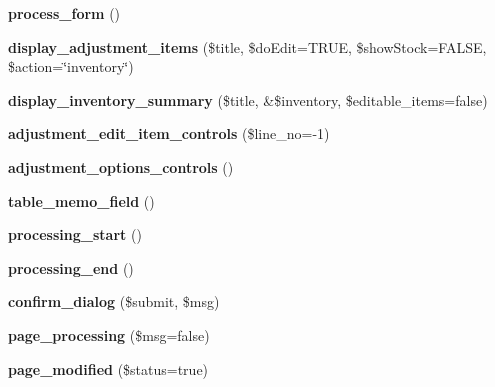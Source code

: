 \begin{DoxyCompactItemize}
\item 
\hypertarget{class_inventory__ui_a36f2f5f79b5aff91d0b736e92f13ff6a}{}\label{class_inventory__ui_a36f2f5f79b5aff91d0b736e92f13ff6a} 
{\bfseries process\+\_\+form} ()
\item 
\hypertarget{class_inventory__ui_a20ada151ac5c6c59298f56e00b3ebdb5}{}\label{class_inventory__ui_a20ada151ac5c6c59298f56e00b3ebdb5} 
{\bfseries display\+\_\+adjustment\+\_\+items} (\$title, \$do\+Edit=T\+R\+UE, \$show\+Stock=F\+A\+L\+SE, \$action=\char`\"{}inventory\char`\"{})
\item 
\hypertarget{class_inventory__ui_a2c9cd2fb8448bb17cbebd6394ab19522}{}\label{class_inventory__ui_a2c9cd2fb8448bb17cbebd6394ab19522} 
{\bfseries display\+\_\+inventory\+\_\+summary} (\$title, \&\$inventory, \$editable\+\_\+items=false)
\item 
\hypertarget{class_inventory__ui_a5692fdde9f762dad33c69b721365481b}{}\label{class_inventory__ui_a5692fdde9f762dad33c69b721365481b} 
{\bfseries adjustment\+\_\+edit\+\_\+item\+\_\+controls} (\$line\+\_\+no=-\/1)
\item 
\hypertarget{class_inventory__ui_a5066d159626933340a36ecf6ccbcd105}{}\label{class_inventory__ui_a5066d159626933340a36ecf6ccbcd105} 
{\bfseries adjustment\+\_\+options\+\_\+controls} ()
\item 
\hypertarget{class_inventory__ui_a494952c93f34161134321691d81cb690}{}\label{class_inventory__ui_a494952c93f34161134321691d81cb690} 
{\bfseries table\+\_\+memo\+\_\+field} ()
\item 
\hypertarget{class_inventory__ui_a0d542d348553d2eae53d09c6b50fcdc5}{}\label{class_inventory__ui_a0d542d348553d2eae53d09c6b50fcdc5} 
{\bfseries processing\+\_\+start} ()
\item 
\hypertarget{class_inventory__ui_a0b19598c5da12d8b6575839fe43ed57c}{}\label{class_inventory__ui_a0b19598c5da12d8b6575839fe43ed57c} 
{\bfseries processing\+\_\+end} ()
\item 
\hypertarget{class_inventory__ui_a3f96b768221aab8a1676c18cc9acc06c}{}\label{class_inventory__ui_a3f96b768221aab8a1676c18cc9acc06c} 
{\bfseries confirm\+\_\+dialog} (\$submit, \$msg)
\item 
\hypertarget{class_inventory__ui_ad48e9be2b4334c75b632a1fc3280a462}{}\label{class_inventory__ui_ad48e9be2b4334c75b632a1fc3280a462} 
{\bfseries page\+\_\+processing} (\$msg=false)
\item 
\hypertarget{class_inventory__ui_a8348636c222a752d1eb99e368eadd142}{}\label{class_inventory__ui_a8348636c222a752d1eb99e368eadd142} 
{\bfseries page\+\_\+modified} (\$status=true)
\end{DoxyCompactItemize}
